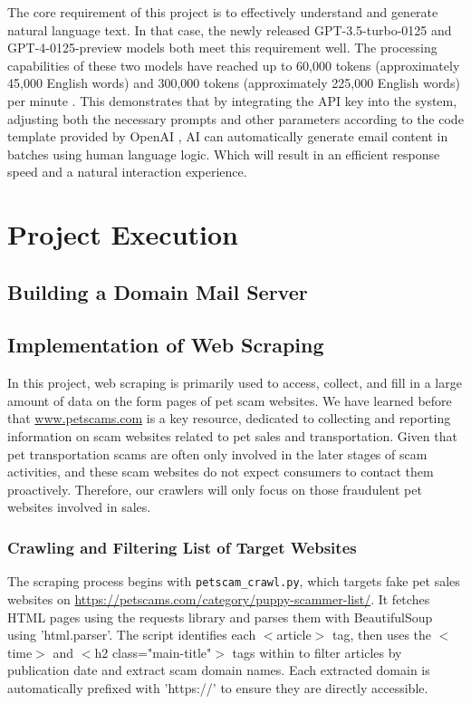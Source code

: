 \documentclass[ oneside,%
                    author={Cassie Qing Tang},
                    degree={BSc},
                     title={An Automated Response System for Disrupting Online Pet Scamming \\ },
                    subtitle={ }]{dissertation}
\begin{document}
The core requirement of this project is to effectively understand and generate natural language text. In that case, the newly released GPT-3.5-turbo-0125 and GPT-4-0125-preview models both meet this requirement well. The processing capabilities of these two models have reached up to 60,000 tokens (approximately 45,000 English words) and 300,000 tokens (approximately 225,000 English words) per minute \cite{noauthor_openai_nodate}. This demonstrates that by integrating the API key into the system, adjusting both the necessary prompts and other parameters according to the code template provided by OpenAI \cite{noauthor_openai_nodate}, AI can automatically generate email content in batches using human language logic. Which will result in an efficient response speed and a natural interaction experience.




\chapter{Project Execution}
\section{Building a Domain Mail Server}





\section{Implementation of Web Scraping}
In this project, web scraping is primarily used to access, collect, and fill in a large amount of data on the form pages of pet scam websites. We have learned before that \url{www.petscams.com} is a key resource, dedicated to collecting and reporting information on scam websites related to pet sales and transportation. Given that pet transportation scams are often only involved in the later stages of scam activities, and these scam websites do not expect consumers to contact them proactively. Therefore, our crawlers will only focus on those fraudulent pet websites involved in sales.

\subsection{Crawling and Filtering List of Target Websites}
The scraping process begins with \texttt{petscam\_crawl.py}, which targets fake pet sales websites on \url{https://petscams.com/category/puppy-scammer-list/}. It fetches HTML pages using the requests library and parses them with BeautifulSoup using 'html.parser'. The script identifies each $<$article$>$ tag, then uses the $<$time$>$ and $<$h2 class="main-title"$>$ tags within to filter articles by publication date and extract scam domain names.  Each extracted domain is automatically prefixed with 'https://' to ensure they are directly accessible.
\\
\end{document}
